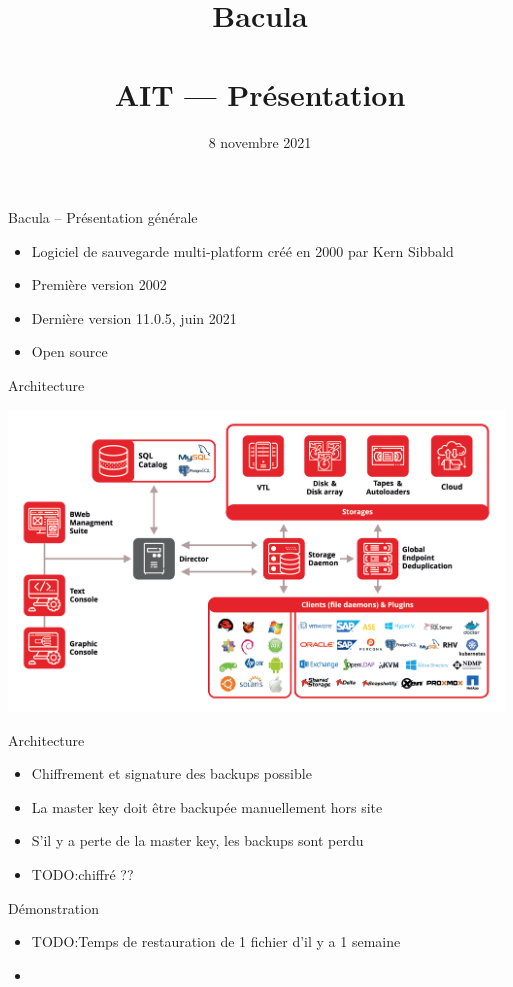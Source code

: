 \documentclass[aspectratio=169]{beamer}
\title{Bacula\\~\\AIT --- Présentation}
\date{8 novembre 2021}
\newcommand{\TODO}{TODO:}
\begin{document}
\begin{frame}
  \titlepage
\end{frame}

\begin{frame}{Bacula -- Présentation générale}
 \begin{itemize}
  \item Logiciel de sauvegarde multi-platform créé en 2000 par Kern Sibbald
  \item Première version 2002
  \item Dernière version 11.0.5, juin 2021
  \item Open source
 \end{itemize}
\end{frame}

\begin{frame}{Architecture}
  \begin{center}
    \includegraphics[height=80mm]{architecture.png}
  \end{center}  
\end{frame}
\begin{frame}{Architecture}
 \begin{itemize}
  \item Chiffrement et signature des backups possible
  \item La master key doit être backupée manuellement hors site
  \item S'il y a perte de la master key, les backups sont perdu
  \item \TODO chiffré ??
 \end{itemize}
\end{frame}

\begin{frame}{Démonstration}
 \begin{itemize}
  \item \TODO Temps de restauration de 1 fichier d'il y a 1 semaine
  \item 
 \end{itemize}
\end{frame}
\end{document}
